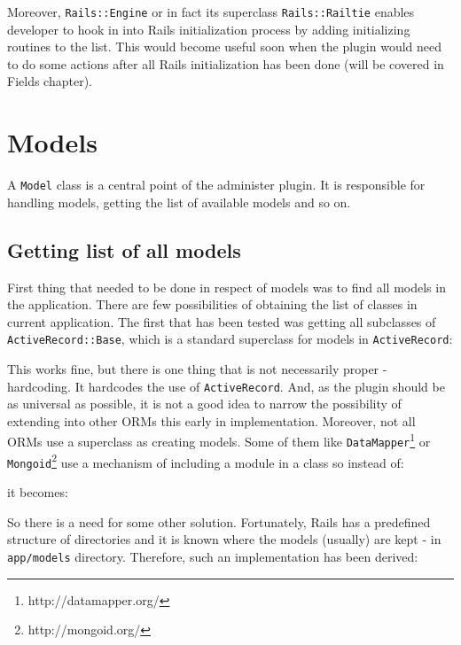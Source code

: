     Moreover, \texttt{Rails::Engine} or in fact its superclass \texttt{Rails::Railtie} enables developer to hook in into Rails
    initialization process by adding initializing routines to the list. This would become useful soon when the plugin would 
    need to do some actions after all Rails initialization has been done (will be covered in Fields chapter).
  \section{Models}
    A \texttt{Model} class is a central point of the administer plugin. It is responsible for handling models, getting the list of available models and so on.
    
    \subsection{Getting list of all models}
      First thing that needed to be done in respect of models was to find all models in the application. There are few possibilities of 
      obtaining the list of classes in current application. The first that has been tested was getting all subclasses of \texttt{ActiveRecord::Base}, which
      is a standard superclass for models in \texttt{ActiveRecord}:
      
      
    
      This works fine, but there is one thing that is not necessarily proper - hardcoding. It hardcodes the use of \texttt{ActiveRecord}. And, as the plugin
      should be as universal as possible, it is not a good idea to narrow the possibility of extending into other ORMs this early in implementation. Moreover,
      not all ORMs use a superclass as creating models. Some of them like \texttt{DataMapper}\footnote{http://datamapper.org/} or \texttt{Mongoid}\footnote{http://mongoid.org/}
      use a mechanism of including a module in a class so instead of:
    
      
  
      it becomes: 
    
      
      
      So there is a need for some other solution. Fortunately, Rails has a predefined structure of directories and it is known where the models (usually) are kept - 
      in \texttt{app/models} directory. Therefore, such an implementation has been derived:
      
